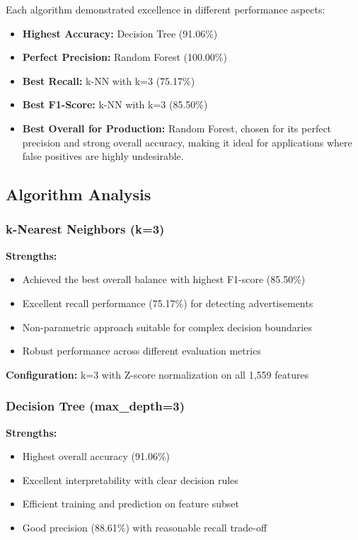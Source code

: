 Each algorithm demonstrated excellence in different performance aspects:

\begin{itemize}
    \item \textbf{Highest Accuracy:} Decision Tree (91.06\%)
    \item \textbf{Perfect Precision:} Random Forest (100.00\%)
    \item \textbf{Best Recall:} k-NN with k=3 (75.17\%)
    \item \textbf{Best F1-Score:} k-NN with k=3 (85.50\%)
    \item \textbf{Best Overall for Production:} Random Forest, chosen for its perfect precision and strong overall accuracy, making it ideal for applications where false positives are highly undesirable.
\end{itemize}

\subsection{Algorithm Analysis}

\subsubsection{k-Nearest Neighbors (k=3)}

\textbf{Strengths:}
\begin{itemize}
    \item Achieved the best overall balance with highest F1-score (85.50\%)
    \item Excellent recall performance (75.17\%) for detecting advertisements
    \item Non-parametric approach suitable for complex decision boundaries
    \item Robust performance across different evaluation metrics
\end{itemize}

\textbf{Configuration:} k=3 with Z-score normalization on all 1,559 features

\subsubsection{Decision Tree (max\_depth=3)}

\textbf{Strengths:}
\begin{itemize}
    \item Highest overall accuracy (91.06\%)
    \item Excellent interpretability with clear decision rules
    \item Efficient training and prediction on feature subset
    \item Good precision (88.61\%) with reasonable recall trade-off
\end{itemize}

